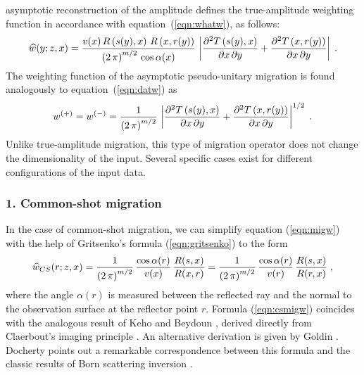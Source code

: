 asymptotic reconstruction of the amplitude defines the true-amplitude
weighting function in accordance with equation~(\ref{eqn:whatw}), as
follows:
\begin{equation}
\widehat{w}(y;z,x)  =  
{{v(x)\,R\left(s(y),x\right)\,R\left(x,r(y)\right)}   
\over {\left(2\,\pi\right)^{m/2}\,\cos{\alpha(x)}}}\,
\left|{{\partial^2 T\left(s(y),x\right)} 
\over {\partial x\,\partial y}} +     
      {{\partial^2 T\left(x,r(y)\right)} 
\over {\partial x\,\partial y}}\right|\;.
\label{eqn:migw}
\end{equation}
The weighting function of the asymptotic pseudo-unitary migration is
found analogously to equation~(\ref{eqn:datw}) as
\begin{equation}
w^{(+)}  =  w^{(-)}  =  {1\over{\left(2\,\pi\right)^{m/2}}} \,
\left|{{\partial^2
T\left(s(y),x\right)}
\over {\partial x\,\partial y}} +     
      {{\partial^2 T\left(x,r(y)\right)} 
\over {\partial x\,\partial y}}\right|^{1/2}\;.
\label{eqn:pumigw}
\end{equation}
Unlike true-amplitude migration, this type of migration operator
does not change the dimensionality of the input. Several specific cases exist
for different configurations of the input data.

\subsubsection{1. Common-shot migration}
In the case of common-shot migration, we can simplify equation (\ref{eqn:migw})
with the help of Gritsenko's formula (\ref{eqn:gritsenko}) to the form
\begin{equation}
\widehat{w}_{CS}(r;z,x)  =  {1\over{\left(2\,\pi\right)^{m/2}}} \,
{{\cos{\alpha(r)}} \over {v(x)}}\,
{{R(s,x)} \over {R(x,r)}} = {1\over{\left(2\,\pi\right)^{m/2}}} \,
{{\cos{\alpha(r)}} \over {v(r)}}\,
{{R(s,x)} \over {R(r,x)}} \;,
\label{eqn:csmigw}
\end{equation}
where the angle $\alpha(r)$ is measured between the reflected ray and
the normal to the observation surface at the reflector point
$r$. Formula (\ref{eqn:csmigw}) coincides with the analogous result of Keho
and Beydoun , derived directly from
Claerbout's imaging principle \cite[]{GEO35.03.04070418}. An alternative
derivation is given by Goldin . Docherty
 points out a remarkable correspondence
between this formula and the classic results of Born scattering
inversion \cite[]{GEO52.07.09310942}.

